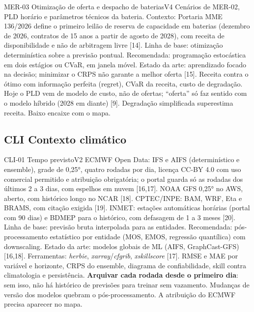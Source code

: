 \begin{ficha}{MER-03 \textperiodcentered{} Otimização de oferta e despacho de baterias}{V4}
 Cenários de MER-02, PLD horário e parâmetros técnicos da
bateria. Contexto: Portaria MME 136/2026 define o primeiro leilão de reserva
de capacidade em baterias (dezembro de 2026, contratos de 15 anos a partir
de agosto de 2028), com receita de disponibilidade e não de arbitragem livre
[14].
 Linha de base: otimização determinística sobre a previsão
pontual. Recomendada: programação estocástica em dois estágios ou CVaR,
em janela móvel. Estado da arte: aprendizado focado na decisão; minimizar o
CRPS não garante a melhor oferta [15].
 Receita contra o ótimo com informação perfeita (regret),
CVaR da receita, custo de degradação.
 Hoje o PLD vem de modelo de custo, não de ofertas; ``oferta''
só faz sentido com o modelo híbrido (2028 em diante) [9]. Degradação
simplificada superestima receita. Baixo encaixe com o mapa.
\end{ficha}

\subsection{CLI \textperiodcentered{} Contexto climático}

\begin{ficha}{CLI-01 \textperiodcentered{} Tempo previsto}{V2}
 ECMWF Open Data: IFS e AIFS (determinístico e ensemble), grade
de 0,25°, quatro rodadas por dia, licença CC-BY 4.0 com uso comercial
permitido e atribuição obrigatória; o portal guarda só as rodadas dos
últimos 2 a 3 dias, com espelhos em nuvem [16,17]. NOAA GFS 0,25° no AWS,
aberto, com histórico longo no NCAR [18]. CPTEC/INPE: BAM, WRF, Eta e BRAMS,
com citação exigida [19]. INMET: estações automáticas horárias (portal com
90 dias) e BDMEP para o histórico, com defasagem de 1 a 3 meses [20].
 Linha de base: previsão bruta interpolada para as
entidades. Recomendada: pós-processamento estatístico por entidade (MOS,
EMOS, regressão quantílica) com downscaling. Estado da arte: modelos globais
de ML (AIFS, GraphCast-GFS) [16,18]. Ferramentas: \emph{herbie},
\emph{xarray}/\emph{cfgrib}, \emph{xskillscore} [17].
 RMSE e MAE por variável e horizonte, CRPS do ensemble,
diagrama de confiabilidade, skill contra climatologia e persistência.
 \textbf{Arquivar cada rodada desde o primeiro dia}: sem
isso, não há histórico de previsões para treinar sem vazamento. Mudanças de
versão dos modelos quebram o pós-processamento. A atribuição do ECMWF precisa
aparecer no mapa.
\end{ficha}

